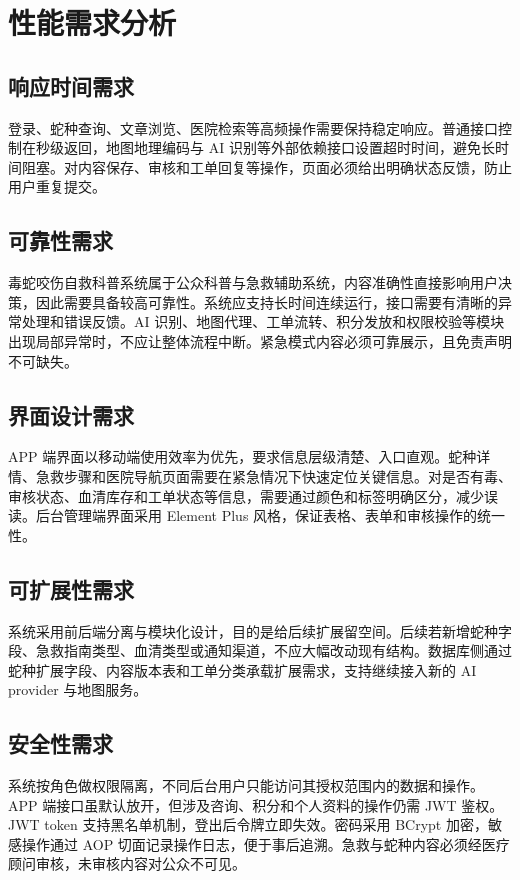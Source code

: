\documentclass[12pt, a4paper, oneside]{ctexrep}
\begin{document}
\section{性能需求分析}
\subsection{响应时间需求}
登录、蛇种查询、文章浏览、医院检索等高频操作需要保持稳定响应。普通接口控制在秒级返回，地图地理编码与 AI 识别等外部依赖接口设置超时时间，避免长时间阻塞。对内容保存、审核和工单回复等操作，页面必须给出明确状态反馈，防止用户重复提交。

\subsection{可靠性需求}
毒蛇咬伤自救科普系统属于公众科普与急救辅助系统，内容准确性直接影响用户决策，因此需要具备较高可靠性。系统应支持长时间连续运行，接口需要有清晰的异常处理和错误反馈。AI 识别、地图代理、工单流转、积分发放和权限校验等模块出现局部异常时，不应让整体流程中断。紧急模式内容必须可靠展示，且免责声明不可缺失。

\subsection{界面设计需求}
APP 端界面以移动端使用效率为优先，要求信息层级清楚、入口直观。蛇种详情、急救步骤和医院导航页面需要在紧急情况下快速定位关键信息。对是否有毒、审核状态、血清库存和工单状态等信息，需要通过颜色和标签明确区分，减少误读。后台管理端界面采用 Element Plus 风格，保证表格、表单和审核操作的统一性。

\subsection{可扩展性需求}
系统采用前后端分离与模块化设计，目的是给后续扩展留空间。后续若新增蛇种字段、急救指南类型、血清类型或通知渠道，不应大幅改动现有结构。数据库侧通过蛇种扩展字段、内容版本表和工单分类承载扩展需求，支持继续接入新的 AI provider 与地图服务。

\subsection{安全性需求}
系统按角色做权限隔离，不同后台用户只能访问其授权范围内的数据和操作。APP 端接口虽默认放开，但涉及咨询、积分和个人资料的操作仍需 JWT 鉴权。JWT token 支持黑名单机制，登出后令牌立即失效。密码采用 BCrypt 加密，敏感操作通过 AOP 切面记录操作日志，便于事后追溯。急救与蛇种内容必须经医疗顾问审核，未审核内容对公众不可见。
\end{document}
